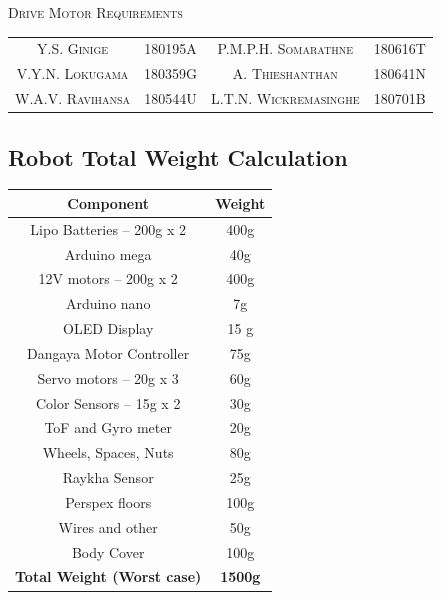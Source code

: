 \documentclass[a4paper, 12pt]{article}
\begin{document}
\begin{center}
     \textsc{\Huge {Drive Motor Requirements\\}}
\end{center}

\begin{center}
\begin{tabular}{c c c c}
     \textsc{Y.S. Ginige} & 180195A &  \textsc{P.M.P.H. Somarathne} & 180616T\\
     \textsc{V.Y.N. Lokugama }& 180359G & \textsc{A. Thieshanthan} &  180641N\\
       \textsc{W.A.V. Ravihansa} &  180544U &  \textsc{L.T.N. Wickremasinghe} & 180701B
\end{tabular}
\end{center}



\normalsize
\subsection*{Robot Total Weight Calculation}
\begin{center}
    

\begin{tabular}{|c |c|}
\hline
Component & Weight \\
\hline
Lipo Batteries – 200g x 2    & 400g \\
Arduino mega          &                        40g\\
12V motors – 200g x 2    &                         400g\\
Arduino nano   &                                  7g\\
OLED Display            &                                    15 g\\
Dangaya Motor Controller   &                   75g\\
Servo motors – 20g x 3     &                       60g\\
Color Sensors – 15g x 2   &                       30g\\
ToF and Gyro meter     &                      20g\\
Wheels, Spaces, Nuts       &                    80g\\
Raykha Sensor              &                        25g\\
Perspex floors             &                       100g\\
Wires and other        &                      50g\\
Body Cover             &                       100g \\
\hline
\textbf{Total Weight (Worst case)}        &       \textbf{1500g}\\
\hline
\end{tabular}
\end{center}
\end{document}
